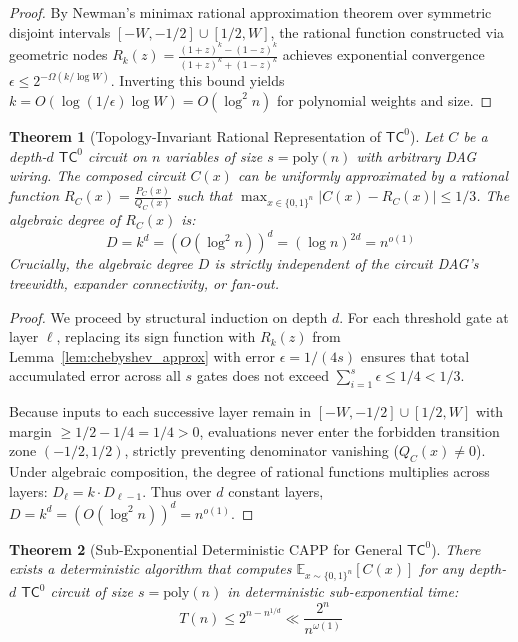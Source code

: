 \documentclass[11pt,a4paper]{article}
\newtheorem{theorem}{Theorem}[section]
\theoremstyle{definition}
\theoremstyle{remark}
\newcommand{\TC}{\mathsf{TC}}
\newcommand{\poly}{\mathrm{poly}}
\newcommand{\E}{\mathbb{E}}
\begin{document}
\begin{proof}
By Newman's minimax rational approximation theorem over symmetric disjoint intervals $[-W, -1/2] \cup [1/2, W]$, the rational function constructed via geometric nodes $R_k(z) = \frac{(1+z)^k - (1-z)^k}{(1+z)^k + (1-z)^k}$ achieves exponential convergence $\epsilon \le 2^{-\Omega(k / \log W)}$. Inverting this bound yields $k = O(\log(1/\epsilon) \log W) = O(\log^2 n)$ for polynomial weights and size.
\end{proof}

\begin{theorem}[Topology-Invariant Rational Representation of $\TC^0$]\label{thm:tc0_rational_rep}
Let $C$ be a depth-$d$ $\TC^0$ circuit on $n$ variables of size $s = \poly(n)$ with arbitrary DAG wiring. The composed circuit $C(x)$ can be uniformly approximated by a rational function $R_C(x) = \frac{P_C(x)}{Q_C(x)}$ such that $\max_{x \in \{0,1\}^n} |C(x) - R_C(x)| \le 1/3$.
The algebraic degree of $R_C(x)$ is:
\[
D = k^d = (O(\log^2 n))^d = (\log n)^{2d} = n^{o(1)}
\]
Crucially, the algebraic degree $D$ is strictly independent of the circuit DAG's treewidth, expander connectivity, or fan-out.
\end{theorem}

\begin{proof}
We proceed by structural induction on depth $d$. For each threshold gate at layer $\ell$, replacing its sign function with $R_k(z)$ from Lemma~\ref{lem:chebyshev_approx} with error $\epsilon = 1/(4s)$ ensures that total accumulated error across all $s$ gates does not exceed $\sum_{i=1}^s \epsilon \le 1/4 < 1/3$.

Because inputs to each successive layer remain in $[-W, -1/2] \cup [1/2, W]$ with margin $\ge 1/2 - 1/4 = 1/4 > 0$, evaluations never enter the forbidden transition zone $(-1/2, 1/2)$, strictly preventing denominator vanishing ($Q_C(x) \neq 0$). Under algebraic composition, the degree of rational functions multiplies across layers: $D_\ell = k \cdot D_{\ell-1}$. Thus over $d$ constant layers, $D = k^d = (O(\log^2 n))^d = n^{o(1)}$.
\end{proof}

\begin{theorem}[Sub-Exponential Deterministic CAPP for General $\TC^0$]\label{thm:tc0_subexp_capp}
There exists a deterministic algorithm that computes $\E_{x \sim \{0,1\}^n}[C(x)]$ for any depth-$d$ $\TC^0$ circuit of size $s = \poly(n)$ in deterministic sub-exponential time:
\[
T(n) \le 2^{n - n^{1/d}} \ll \frac{2^n}{n^{\omega(1)}}
\]
\end{theorem}
\end{document}
